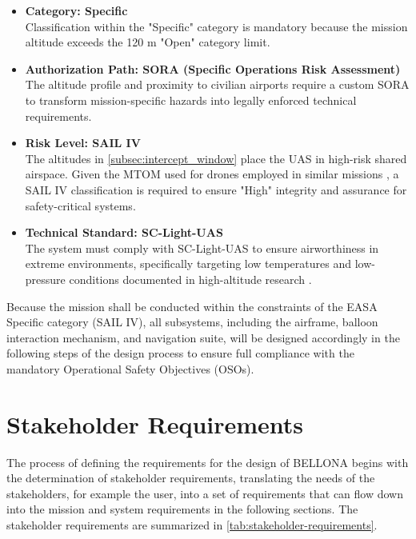 \begin{itemize}
    \item \textbf{Category: Specific} \\ 
    Classification within the "Specific" category is mandatory because the mission altitude exceeds the 120 m "Open" category limit.
    
    \item \textbf{Authorization Path: SORA (Specific Operations Risk Assessment)} \\ 
    The altitude profile and proximity to civilian airports require a custom SORA to transform mission-specific hazards into legally enforced technical requirements.
    
    \item \textbf{Risk Level: SAIL IV} \\ 
    The altitudes in \autoref{subsec:intercept_window} place the UAS in high-risk shared airspace. Given the MTOM used for drones employed in similar missions \cite{EuropeanCommission2019CommissionSystems}, a SAIL IV classification is required to ensure "High" integrity and assurance for safety-critical systems.
    
    \item \textbf{Technical Standard: SC-Light-UAS \cite{EuropeanUnionAviationSafetyAgency2020SpecialSystems}} \\ 
    The system must comply with SC-Light-UAS to ensure airworthiness in extreme environments, specifically targeting low temperatures and low-pressure conditions documented in high-altitude research \cite{Clark2019AnPayloadsb}.
\end{itemize}

Because the mission shall be conducted within the constraints of the EASA Specific category (SAIL IV), all subsystems, including the airframe, balloon interaction mechanism, and navigation suite, will be designed accordingly in the following steps of the design process to ensure full compliance with the mandatory Operational Safety Objectives (OSOs).
\vspace{-10pt}

\section{Stakeholder Requirements}

The process of defining the requirements for the design of BELLONA begins with the determination of stakeholder requirements, translating the needs of the stakeholders, for example the user, into a set of requirements that can flow down into the mission and system requirements in the following sections. The stakeholder requirements are summarized in \autoref{tab:stakeholder-requirements}. 


